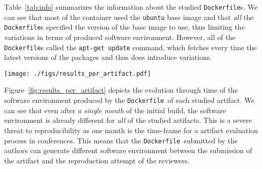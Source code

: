 \documentclass[sigconf,natbib=false]{acmart}
\newcommand{\df}{\texttt{Dockerfile}}
\begin{document}
\begin{table}
  \centering
  \caption{Information about the \df s from the study}\label{tab:info}
\end{table}

Table~\ref{tab:info} summarizes the information about the studied \df s.
We can see that most of the container used the \texttt{ubuntu} base image and that \emph{all} the \df s specified the version of the base image to use, thus limiting the variations in terms of produced software environment.
However, all of the \df s called the \texttt{apt-get update} command, which fetches every time the latest versions of the packages and thus does introduce variations.

\begin{figure*}
  \centering
  \texttt{[image: ./figs/results\_per\_artifact.pdf]}
  \caption{
    Evolution of the packages in the software environment of each container through time.
    Each container has been rebuilt once a month.
    The color of the bar corresponds to the month when a specific version of a package has been introduced in the software environment.
    We can see that the proportion of package versions similar to the versions in the initial build is decreasing through the months.
  }
  \label{fig:results_per_artifact}
\end{figure*}

Figure~\ref{fig:results_per_artifact} depicts the evolution through time of the software environment produced by the \df\ of each studied artifact.
We can see that even after \emph{a single month} of the initial build, the software environment is already different for \emph{all} of the studied artifacts.
This is a severe threat to reproducibility as one month is the time-frame for a artifact evaluation process in conferences.
This means that the \df\ submitted by the authors can generate different software environment between the submission of the artifact and the reproduction attempt of the reviewers.
\end{document}
